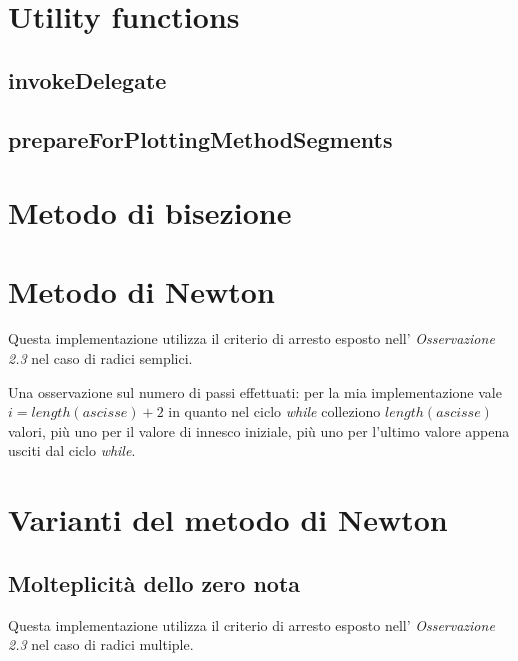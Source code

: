 \section{Utility functions}
\subsection{invokeDelegate}


\subsection{prepareForPlottingMethodSegments}


\section{Metodo di bisezione}
\label{sec:bisectionIterativeMethod}


\section{Metodo di Newton}
\label{sec:newtonIterativeMethod}
Questa implementazione utilizza il criterio di arresto esposto nell'
\emph{Osservazione 2.3} nel caso di radici semplici.

Una osservazione sul numero di passi effettuati: per la mia implementazione
vale $i = length(ascisse) + 2$ in quanto nel ciclo \emph{while} colleziono
$length(ascisse)$ valori, pi\`u uno per il valore di innesco iniziale, pi\`u uno
per l'ultimo valore appena usciti dal ciclo \emph{while}.


\section{Varianti del metodo di Newton}

\subsection{Molteplicit\`a dello zero nota}
\label{subsec:newtonMethodMultKnown}
Questa implementazione utilizza il criterio di arresto esposto nell'
\emph{Osservazione 2.3} nel caso di radici multiple.



